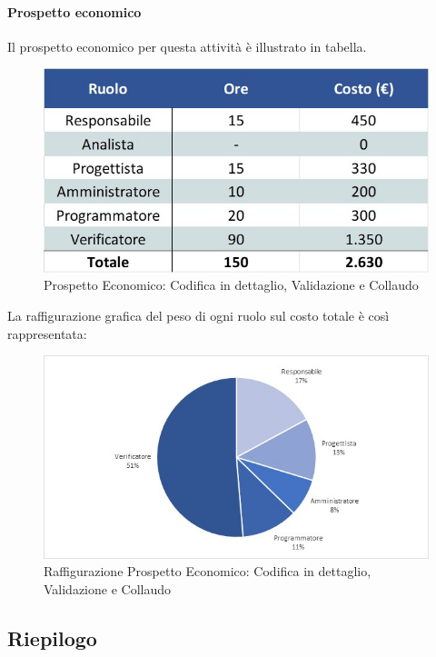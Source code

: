 \paragraph{Prospetto economico}
Il prospetto economico per questa attività è illustrato in tabella. 
\begin{figure}[h!]
	\centerline{\includegraphics[scale=0.4]{img/Preventivo/CodDettaglioValidazioneCollaudoEconomico.jpg}}
	\caption{Prospetto Economico: Codifica in dettaglio, Validazione e Collaudo}
\end{figure}
La raffigurazione grafica del peso di ogni ruolo sul costo totale è così rappresentata: 
\begin{figure}[h!]
	\centerline{\includegraphics[scale=0.4]{img/Preventivo/Torte/CodDettaglioValidazioneCollaudo.jpg}}
	\caption{Raffigurazione Prospetto Economico: Codifica in dettaglio, Validazione e Collaudo}
\end{figure} 

\subsection{Riepilogo}

